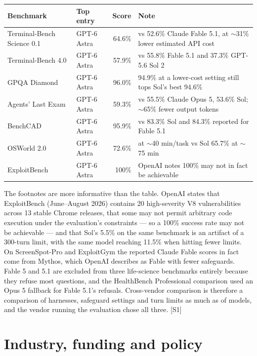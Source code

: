 \documentclass[11pt,a4paper]{article}
\newcommand{\srcref}[1]{\textcolor{brandaccent}{[S#1]}}
\begin{document}
{\footnotesize
\begin{tabularx}{\textwidth}{@{}l l r X@{}}
\toprule
\textbf{Benchmark} & \textbf{Top entry} & \textbf{Score} & \textbf{Note} \\
\midrule
Terminal-Bench Science 0.1 & GPT-6 Astra & 64.6\% & vs 52.6\% Claude Fable 5.1, at $\sim$31\% lower estimated API cost \\
Terminal-Bench 4.0        & GPT-6 Astra & 57.9\% & vs 55.8\% Fable 5.1 and 37.3\% GPT-5.6 Sol 2 \\
GPQA Diamond              & GPT-6 Astra & 96.0\% & 94.9\% at a lower-cost setting still tops Sol's best 94.6\% \\
Agents' Last Exam         & GPT-6 Astra & 59.3\% & vs 55.5\% Claude Opus 5, 53.6\% Sol; $\sim$65\% fewer output tokens \\
BenchCAD                  & GPT-6 Astra & 95.9\% & vs 83.3\% Sol and 84.3\% reported for Fable 5.1 \\
OSWorld 2.0               & GPT-6 Astra & 72.6\% & at $\sim$40 min/task vs Sol 65.7\% at $\sim$75 min \\
ExploitBench              & GPT-6 Astra & 100\%  & OpenAI notes 100\% may not in fact be achievable \\
\bottomrule
\end{tabularx}}
\vspace{0.4em}

The footnotes are more informative than the table. OpenAI states that ExploitBench
(June--August 2026) contains 20 high-severity V8 vulnerabilities across 13 stable Chrome
releases, that some may not permit arbitrary code execution under the evaluation's
constraints --- so a 100\% success rate may not be achievable --- and that Sol's 5.5\% on
the same benchmark is an artifact of a 300-turn limit, with the same model reaching 11.5\%
when hitting fewer limits. On ScreenSpot-Pro and ExploitGym the reported Claude Fable
scores in fact come from Mythos, which OpenAI describes as Fable with fewer safeguards.
Fable 5 and 5.1 are excluded from three life-science benchmarks entirely because they
refuse most questions, and the HealthBench Professional comparison used an Opus 5 fallback
for Fable 5.1's refusals. Cross-vendor comparison is therefore a comparison of harnesses,
safeguard settings and turn limits as much as of models, and the vendor running the
evaluation chose all three. \srcref{1}

\section{Industry, funding and policy}
\end{document}
